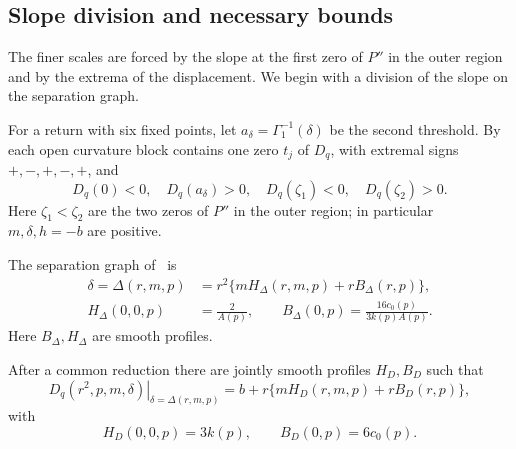 \subsection{Slope division and necessary bounds}

The finer scales are forced by the slope at the first zero of $P''$ in the
outer region and by the extrema of the displacement. We begin with a division
of the slope on the separation graph.

For a return with six fixed points, let $a_\delta=\Gamma_1^{-1}(\delta)$ be the
second threshold. By~\cite[Lemma~\ref*{main-sat:saturation}]{main2026} each
open curvature block contains one zero $t_j$ of $D_q$, with extremal signs
$+,-,+,-,+$, and
\begin{equation}\label{corner:saturation-slopes}
 D_q(0)<0,\quad D_q(a_\delta)>0,\quad D_q(\zeta_1)<0,\quad D_q(\zeta_2)>0.
\end{equation}
Here \(\zeta_1<\zeta_2\) are the two zeros of \(P''\) in the outer region; in
particular
\(m,\delta,h=-b\) are positive.

The separation graph of~\cite[Section~3]{main2026} is
\begin{equation}\label{corner:curvature-division}
 \begin{aligned}
 \delta=\Delta(r,m,p)&=r^2\{mH_\Delta(r,m,p)+rB_\Delta(r,p)\},\\
 H_\Delta(0,0,p)&=\frac2{A(p)},\qquad
 B_\Delta(0,p)=\frac{16c_0(p)}{3k(p)A(p)}.
 \end{aligned}
\end{equation}
Here $B_\Delta,H_\Delta$ are smooth profiles.

\begin{lemma}
\label{corner:graph-slope}
After a common reduction there are jointly smooth profiles $H_D,B_D$
such that
\begin{equation}\label{corner:exact-graph-slope}
 \left.D_q(r^2,p,m,\delta)\right|_{\delta=\Delta(r,m,p)}
 =b+r\{mH_D(r,m,p)+rB_D(r,p)\},
\end{equation}
with
\begin{equation}\label{corner:graph-slope-coefficients}
 H_D(0,0,p)=3k(p),\qquad B_D(0,p)=6c_0(p).
\end{equation}
\end{lemma}


